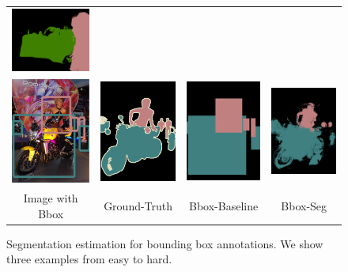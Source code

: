 \begin{figure}
\begin{tabular}{c c c c}
    \includegraphics[width=0.21\linewidth]{fig/erode_bbox/crf/2009_000219.png} \\        \includegraphics[width=0.21\linewidth]{fig/erode_bbox/img/2009_002382.jpg} & 
    \includegraphics[width=0.21\linewidth]{fig/erode_bbox/gt/2009_002382.png} & 
    \includegraphics[width=0.21\linewidth]{fig/erode_bbox/bbox/2009_002382.png} & 
    \includegraphics[width=0.21\linewidth]{fig/erode_bbox/crf/2009_002382.png} \\    
    {\scriptsize Image with Bbox} & {\scriptsize Ground-Truth} & {\scriptsize Bbox-Baseline} & {\scriptsize Bbox-Seg}
  \end{tabular}
  \caption{Segmentation estimation for bounding box annotations. We
    show three examples from easy to hard.}
  \label{fig:bbox_illustration}
\end{figure}


